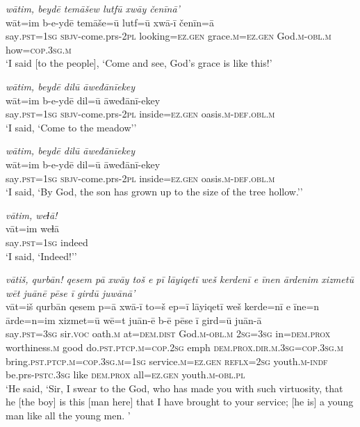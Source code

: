 \ea \label{ZQ.46}
\textit{wātim, beydē temāšew lutfū xwāy čenīnā’} \\ 
\gll wāt=im b-e-ydē temāše=ū lutf=ū xwā-ī čenīn=ā \\ 
 say\textsc{.pst}\textsc{=\textsc{1sg}} \textsc{sbjv-}come.prs-\textsc{2pl} looking\textsc{=ez.gen} grace\textsc{.m}\textsc{=ez.gen} God\textsc{.m}\textsc{-obl}\textsc{.m} how\textsc{=cop}\textsc{.3sg}\textsc{.m} \\ 
\glt `I said [to the people], ‘Come and see, God’s grace is like this!'
\z 
 
\ea \label{ZQ.48}
\textit{wātim, beydē dilū āweđānīekey} \\ 
\gll wāt=im b-e-ydē dil=ū āweđānī-ekey \\ 
 say\textsc{.pst}\textsc{=\textsc{1sg}} \textsc{sbjv-}come.prs-\textsc{2pl} inside\textsc{=ez.gen} oasis\textsc{.m}\textsc{-def}\textsc{.obl}\textsc{.m} \\ 
\glt `I said, ‘Come to the meadow’'
\z 
 
\ea \label{ZQ.50}
\textit{wātim, beydē dilū āweđānīekey} \\ 
\gll wāt=im b-e-ydē dil=ū āweđānī-ekey \\ 
 say\textsc{.pst}\textsc{=\textsc{1sg}} \textsc{sbjv-}come.prs-\textsc{2pl} inside\textsc{=ez.gen} oasis\textsc{.m}\textsc{-def}\textsc{.obl}\textsc{.m} \\ 
\glt `I said, ‘By God, the son has grown up to the size of the tree hollow.’'
\z 
 
\ea \label{ZQ.52}
\textit{vātim, weɫā!} \\ 
\gll vāt=im weɫā \\ 
 say\textsc{.pst}\textsc{=\textsc{1sg}} indeed \\ 
\glt `I said, ‘Indeed!’'
\z 
 
\ea \label{ZQ.54}
\textit{vātiš, qurbān! qesem pā xwāy toš e pī lāyiqetī weš kerdenī e īnen ārdenim xizmetū wēt juānē pēse ī girdū juwānā’} \\ 
\gll vāt=iš qurbān qesem p=ā xwā-ī to=š ep=ī lāyiqetī weš kerde=nī e īne=n ārde=n=im xizmet=ū wē=t juān-ē b-ē pēse ī gird=ū juān-ā \\ 
 say\textsc{.pst}\textsc{=3sg} sir.\textsc{voc} oath\textsc{.m} at=\textsc{dem.dist} God\textsc{.m}\textsc{-obl}\textsc{.m} \textsc{2sg}\textsc{=3sg} in=\textsc{dem.prox} worthiness\textsc{.m} good do\textsc{.pst}\textsc{.ptcp}\textsc{.m}\textsc{=cop}\textsc{.\textsc{2sg}} emph \textsc{dem.prox}\textsc{.dir}\textsc{.m}\textsc{.3sg}\textsc{=cop}\textsc{.3sg}\textsc{.m} bring\textsc{.pst}\textsc{.ptcp}\textsc{.m}\textsc{=cop}\textsc{.3sg}\textsc{.m}\textsc{=\textsc{1sg}} service\textsc{.m}\textsc{=ez.gen} \textsc{reflx}\textsc{=\textsc{2sg}} youth\textsc{.m}\textsc{-indf} be.prs\textsc{-pstc}\textsc{.3sg} like \textsc{dem.prox} all\textsc{=ez.gen} youth\textsc{.m}\textsc{-obl}\textsc{.pl} \\ 
\glt `He said, ‘Sir, I swear to the God, who has made you with such virtuosity, that he [the boy] is this [man here] that I have brought to your service; [he is] a young man like all the young men. '
\z 
 
